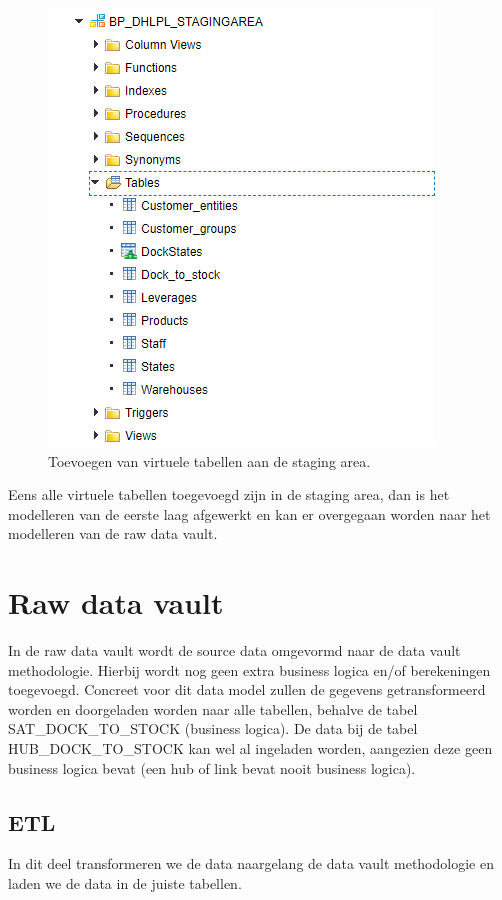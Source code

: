 \begin{figure}[h]
	\centering
	\includegraphics[scale=0.45]{../images/DV_staging.png}
	\caption{Toevoegen van virtuele tabellen aan de staging area.}
	\label{fig:dpa}
\end{figure}

Eens alle virtuele tabellen toegevoegd zijn in de staging area, dan is het modelleren van de eerste laag afgewerkt en kan er overgegaan worden naar het modelleren van de raw data vault.

\section{Raw data vault}
In de raw data vault wordt de source data omgevormd naar de data vault methodologie. Hierbij wordt nog geen extra business logica en/of berekeningen toegevoegd. Concreet voor dit data model zullen de gegevens getransformeerd worden en doorgeladen worden naar alle tabellen, behalve de tabel SAT\_DOCK\_TO\_STOCK (business logica). De data bij de tabel HUB\_DOCK\_TO\_STOCK kan wel al ingeladen worden, aangezien deze geen business logica bevat (een hub of link bevat nooit business logica).

\subsection{ETL}
In dit deel transformeren we de data naargelang de data vault methodologie en laden we de data in de juiste tabellen. 

